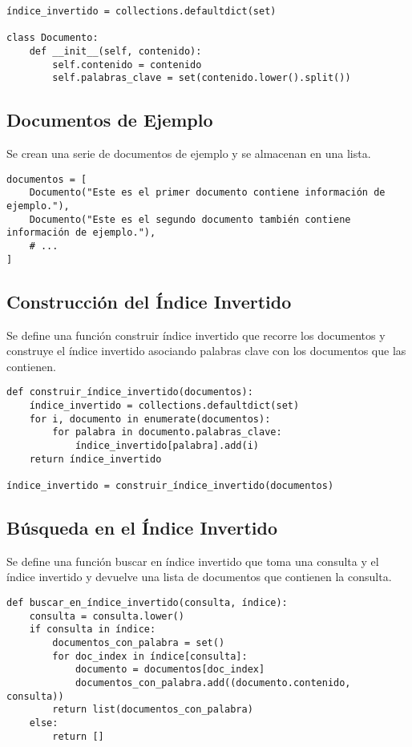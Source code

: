\documentclass[journal]{IEEEtran}
\begin{document}
\begin{lstlisting}[style=custompython]
índice_invertido = collections.defaultdict(set)

class Documento:
    def __init__(self, contenido):
        self.contenido = contenido
        self.palabras_clave = set(contenido.lower().split())
\end{lstlisting}

\subsection{Documentos de Ejemplo}
Se crean una serie de documentos de ejemplo y se almacenan en una lista.

\begin{lstlisting}[style=custompython]
documentos = [
    Documento("Este es el primer documento contiene información de ejemplo."),
    Documento("Este es el segundo documento también contiene información de ejemplo."),
    # ...
]
\end{lstlisting}

\subsection{Construcción del Índice Invertido}
Se define una función construir índice invertido que recorre los documentos y construye el índice invertido asociando palabras clave con los documentos que las contienen.

\begin{lstlisting}[style=custompython]
def construir_índice_invertido(documentos):
    índice_invertido = collections.defaultdict(set)
    for i, documento in enumerate(documentos):
        for palabra in documento.palabras_clave:
            índice_invertido[palabra].add(i)
    return índice_invertido

índice_invertido = construir_índice_invertido(documentos)
\end{lstlisting}

\subsection{Búsqueda en el Índice Invertido}
Se define una función buscar en índice invertido que toma una consulta y el índice invertido y devuelve una lista de documentos que contienen la consulta.

\begin{lstlisting}[style=custompython]
def buscar_en_índice_invertido(consulta, índice):
    consulta = consulta.lower()
    if consulta in índice:
        documentos_con_palabra = set()
        for doc_index in índice[consulta]:
            documento = documentos[doc_index]
            documentos_con_palabra.add((documento.contenido, consulta))
        return list(documentos_con_palabra)
    else:
        return []
\end{lstlisting}
\end{document}
